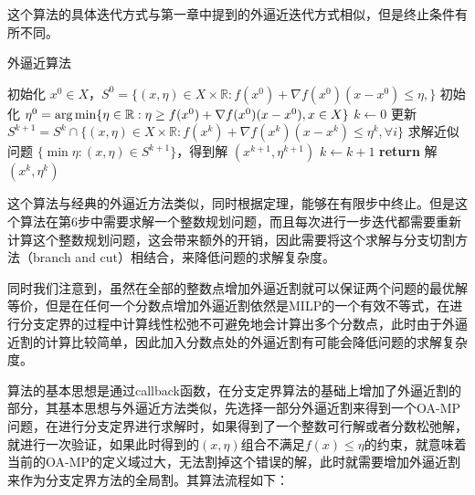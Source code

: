 这个算法的具体迭代方式与第一章中提到的外逼近迭代方式相似，但是终止条件有所不同。
\begin{algorithm}[!htbp]
    \small
    \caption{外逼近算法}\label{alg:integer_outer_approximation}
    \begin{algorithmic}[1]
        \State 初始化 $x^0 \in X$，$S^0 = \{(x, \eta) \in X \times \mathbb{R} : f(x^0) + \nabla f(x^0) (x - x^0) \leq \eta,\}$
        \State 初始化 $\eta^0 = \arg \min \{\eta \in \mathbb{R} : \eta \geq f(x^0) + \nabla f(x^0) (x - x^0), x \in X\}$
        \State $k \gets 0$
            \State 更新 $S^{k+1} = S^k \cap \{(x, \eta) \in X \times \mathbb{R} : f(x^k) + \nabla f(x^k) (x - x^k) \leq \eta^k, \forall i\}$
            \State 求解近似问题 $\{\min \eta : (x, \eta) \in S^{k + 1}\}$，得到解 $(x^{k+1}, \eta^{k+1})$
            \State $k \gets k + 1$
        \EndWhile
        \State \textbf{return} 解 $(x^{k}, \eta^{k})$
        \EndProcedure
    \end{algorithmic}
\end{algorithm}

这个算法与经典的外逼近方法类似，同时根据定理，能够在有限步中终止。但是这个算法在第6步中需要求解一个整数规划问题，而且每次进行一步迭代都需要重新计算这个整数规划问题，这会带来额外的开销，因此需要将这个求解与分支切割方法（branch and cut）相结合，来降低问题的求解复杂度。

同时我们注意到，虽然在全部的整数点增加外逼近割就可以保证两个问题的最优解等价，但是在任何一个分数点增加外逼近割依然是MILP的一个有效不等式，在进行分支定界的过程中计算线性松弛不可避免地会计算出多个分数点，此时由于外逼近割的计算比较简单，因此加入分数点处的外逼近割有可能会降低问题的求解复杂度。

算法的基本思想是通过callback函数，在分支定界算法的基础上增加了外逼近割的部分，其基本思想与外逼近方法类似，先选择一部分外逼近割来得到一个OA-MP问题，在进行分支定界进行求解时，如果得到了一个整数可行解或者分数松弛解，就进行一次验证，如果此时得到的$(x,\eta)$组合不满足$f(x) \leq \eta$的约束，就意味着当前的OA-MP的定义域过大，无法割掉这个错误的解，此时就需要增加外逼近割来作为分支定界方法的全局割。其算法流程如下：

